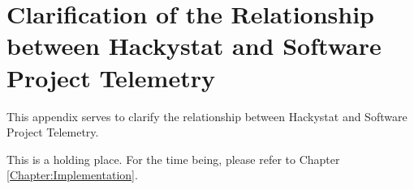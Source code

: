 \chapter{Clarification of the Relationship between Hackystat and Software Project Telemetry}
\label{Chapter:TelemetryAndHackystat}


This appendix serves to clarify the relationship between Hackystat and Software Project Telemetry.


This is a holding place. For the time being, please refer to Chapter \ref{Chapter:Implementation}.